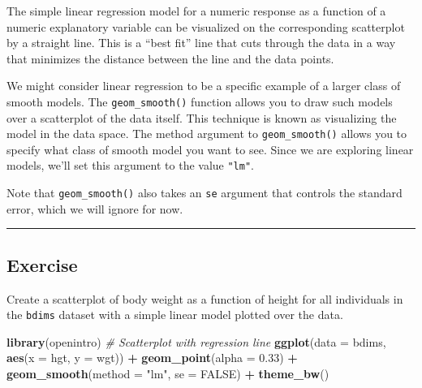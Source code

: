 \documentclass[
]{book}
\newenvironment{Shaded}{\begin{snugshade}}{\end{snugshade}}
\newcommand{\CommentTok}[1]{\textcolor[rgb]{0.56,0.35,0.01}{\textit{#1}}}
\newcommand{\DataTypeTok}[1]{\textcolor[rgb]{0.13,0.29,0.53}{#1}}
\newcommand{\FloatTok}[1]{\textcolor[rgb]{0.00,0.00,0.81}{#1}}
\newcommand{\KeywordTok}[1]{\textcolor[rgb]{0.13,0.29,0.53}{\textbf{#1}}}
\newcommand{\NormalTok}[1]{#1}
\newcommand{\OperatorTok}[1]{\textcolor[rgb]{0.81,0.36,0.00}{\textbf{#1}}}
\newcommand{\OtherTok}[1]{\textcolor[rgb]{0.56,0.35,0.01}{#1}}
\newcommand{\StringTok}[1]{\textcolor[rgb]{0.31,0.60,0.02}{#1}}
\begin{document}
The simple linear regression model for a numeric response as a function of a numeric explanatory variable can be visualized on the corresponding scatterplot by a straight line. This is a ``best fit'' line that cuts through the data in a way that minimizes the distance between the line and the data points.

We might consider linear regression to be a specific example of a larger class of smooth models. The \texttt{geom\_smooth()} function allows you to draw such models over a scatterplot of the data itself. This technique is known as visualizing the model in the data space. The method argument to \texttt{geom\_smooth()} allows you to specify what class of smooth model you want to see. Since we are exploring linear models, we'll set this argument to the value \texttt{"lm"}.

Note that \texttt{geom\_smooth()} also takes an \texttt{se} argument that controls the standard error, which we will ignore for now.

\begin{center}\rule{0.5\linewidth}{0.5pt}\end{center}

\hypertarget{exercise-8}{%
\subsection*{Exercise}\label{exercise-8}}

Create a scatterplot of body weight as a function of height for all individuals in the \texttt{bdims} dataset with a simple linear model plotted over the data.

\begin{Shaded}
\begin{Highlighting}[]
\KeywordTok{library}\NormalTok{(openintro)}
\CommentTok{# Scatterplot with regression line}
\KeywordTok{ggplot}\NormalTok{(}\DataTypeTok{data =}\NormalTok{ bdims, }\KeywordTok{aes}\NormalTok{(}\DataTypeTok{x =}\NormalTok{ hgt, }\DataTypeTok{y =}\NormalTok{ wgt)) }\OperatorTok{+}\StringTok{ }
\StringTok{  }\KeywordTok{geom_point}\NormalTok{(}\DataTypeTok{alpha =} \FloatTok{0.33}\NormalTok{) }\OperatorTok{+}\StringTok{ }
\StringTok{  }\KeywordTok{geom_smooth}\NormalTok{(}\DataTypeTok{method =} \StringTok{"lm"}\NormalTok{, }\DataTypeTok{se =} \OtherTok{FALSE}\NormalTok{) }\OperatorTok{+}\StringTok{ }
\StringTok{  }\KeywordTok{theme_bw}\NormalTok{()}
\end{Highlighting}
\end{Shaded}
\end{document}
